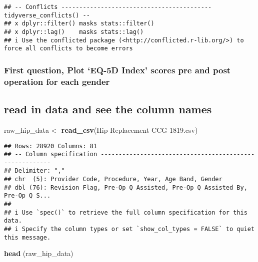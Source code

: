 \documentclass[
]{article}
\newenvironment{Shaded}{\begin{snugshade}}{\end{snugshade}}
\newcommand{\FunctionTok}[1]{\textcolor[rgb]{0.13,0.29,0.53}{\textbf{#1}}}
\newcommand{\NormalTok}[1]{#1}
\newcommand{\OtherTok}[1]{\textcolor[rgb]{0.56,0.35,0.01}{#1}}
\newcommand{\StringTok}[1]{\textcolor[rgb]{0.31,0.60,0.02}{#1}}
\begin{document}
\begin{verbatim}
## -- Conflicts ------------------------------------------ tidyverse_conflicts() --
## x dplyr::filter() masks stats::filter()
## x dplyr::lag()    masks stats::lag()
## i Use the conflicted package (<http://conflicted.r-lib.org/>) to force all conflicts to become errors
\end{verbatim}

\subsubsection{First question, Plot `EQ-5D Index' scores pre and post
operation for each
gender}\label{first-question-plot-eq-5d-index-scores-pre-and-post-operation-for-each-gender}

\subsection{read in data and see the column
names}\label{read-in-data-and-see-the-column-names}

\begin{Shaded}
\begin{Highlighting}[]
\NormalTok{raw\_hip\_data }\OtherTok{\textless{}{-}} \FunctionTok{read\_csv}\NormalTok{(}\StringTok{\textquotesingle{}Hip Replacement CCG 1819.csv\textquotesingle{}}\NormalTok{)}
\end{Highlighting}
\end{Shaded}

\begin{verbatim}
## Rows: 28920 Columns: 81
## -- Column specification --------------------------------------------------------
## Delimiter: ","
## chr  (5): Provider Code, Procedure, Year, Age Band, Gender
## dbl (76): Revision Flag, Pre-Op Q Assisted, Pre-Op Q Assisted By, Pre-Op Q S...
## 
## i Use `spec()` to retrieve the full column specification for this data.
## i Specify the column types or set `show_col_types = FALSE` to quiet this message.
\end{verbatim}

\begin{Shaded}
\begin{Highlighting}[]
\FunctionTok{head}\NormalTok{ (raw\_hip\_data)}
\end{Highlighting}
\end{Shaded}
\end{document}

